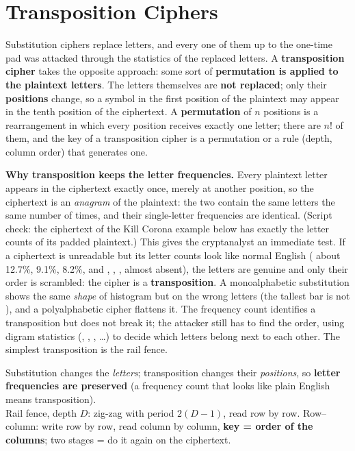 \section{Transposition Ciphers}\label{sec:transp}
Substitution ciphers replace letters, and every one of them up to the one-time pad was attacked through the statistics of the replaced letters. A \textbf{transposition cipher} takes the opposite approach: some sort of \textbf{permutation is applied to the plaintext letters}. The letters themselves are \textbf{not replaced}; only their \textbf{positions} change, so a symbol in the first position of the plaintext may appear in the tenth position of the ciphertext. A \textbf{permutation} of $n$ positions is a rearrangement in which every position receives exactly one letter; there are $n!$ of them, and the key of a transposition cipher is a permutation or a rule (depth, column order) that generates one.

\textbf{Why transposition keeps the letter frequencies.} Every plaintext letter appears in the ciphertext exactly once, merely at another position, so the ciphertext is an \emph{anagram} of the plaintext: the two contain the same letters the same number of times, and their single-letter frequencies are identical. (Script check: the ciphertext of the Kill Corona example below has exactly the letter counts of its padded plaintext.) This gives the cryptanalyst an immediate test. If a ciphertext is unreadable but its letter counts look like normal English ( about 12.7\%,  9.1\%,  8.2\%, and , , ,  almost absent), the letters are genuine and only their order is scrambled: the cipher is a \textbf{transposition}. A monoalphabetic substitution shows the same \emph{shape} of histogram but on the wrong letters (the tallest bar is not ), and a polyalphabetic cipher flattens it. The frequency count identifies a transposition but does not break it; the attacker still has to find the order, using digram statistics (, , , \dots) to decide which letters belong next to each other. The simplest transposition is the rail fence.

\begin{mustknow}[: transposition]
Substitution changes the \emph{letters}; transposition changes their \emph{positions}, so \textbf{letter frequencies are preserved} (a frequency count that looks like plain English means transposition).\\
Rail fence, depth $D$: zig-zag with period $2(D-1)$, read row by row. Row--column: write row by row, read column by column, \textbf{key = order of the columns}; two stages = do it again on the ciphertext.
\end{mustknow}

